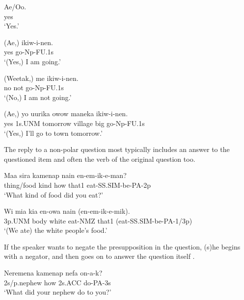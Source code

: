 \ea%
\label{ex:x1217}
\gll Ae/Oo. \\
 yes     \\
\glt `Yes.'
\z





\ea%
\label{ex:x1218}
\gll (Ae,)  ikiw-i-nen. \\
yes  go-Np-FU.1s      \\
\glt `(Yes,) I am going.'
\z





\ea%
\label{ex:x1220}
\gll (Weetak,)  me  ikiw-i-nen. \\
no  not  go-Np-FU.1s      \\
\glt `(No,) I am not going.'
\z





\ea%
\label{ex:x1219}
\gll (Ae,)  yo  uurika  owow  maneka  ikiw-i-nen. \\
 yes  1s.UNM  tomorrow  village  big  go-Np-FU.1s     \\
\glt `(Yes,) I'll go to town tomorrow.'
\z





The reply to a non-polar question most typically includes an answer to the questioned item and often the verb of the original question too.

\ea%
\label{ex:x1221}
\gll Maa  sira  kamenap  nain  en-em-ik-e-man? \\
thing/food  kind  how  that1  eat-SS.SIM-be-PA-2p      \\
\glt `What kind of food did you eat?'
\z





\ea%
\label{ex:x1222}
\gll Wi  mia  kia  en-owa  nain  (en-em-ik-e-mik). \\
3p.UNM  body  white  eat-NMZ  that1  (eat-SS.SIM-be-PA-1/3p)      \\
\glt `(We ate) the white people's food.'
\z





If the speaker wants to negate the presupposition in the question, (s)he begins with a negator, and then goes on to answer the question itself .

\ea%
\label{ex:x1223}
\gll Neremena  kamenap  nefa  on-a-k? \\
2s/p.nephew  how  2s.ACC  do-PA-3s      \\
\glt `What did your nephew do to you?'
\z





